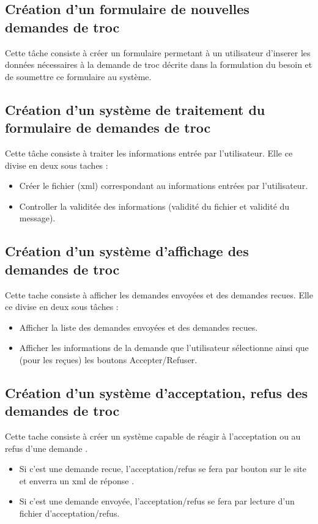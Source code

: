\documentclass{article}
\begin{document}
\subsection{Création d'un formulaire de nouvelles demandes de troc}
Cette tâche consiste à créer un formulaire permetant à un utilisateur d'inserer les données nécessaires à la demande de troc décrite dans la formulation du besoin et de soumettre ce formulaire au système.
\subsection{Création d'un système de traitement du formulaire de demandes de troc}
Cette tâche consiste à traiter les informations entrée par l'utilisateur. Elle ce divise en deux sous taches :
\begin{itemize}
  \item Créer le fichier (xml) correspondant au informations entrées par l'utilisateur.
  \item Controller la validitée des informations (validité du fichier et validité du message).
\end{itemize}

\subsection{Création d'un système d'affichage des demandes de troc}
Cette tache consiste à afficher les demandes envoyées et des demandes recues. Elle ce divise en deux sous tâches :
\begin{itemize}
  \item Afficher la liste des demandes envoyées et des demandes recues.
  \item Afficher les informations de la demande que l'utilisateur sélectionne ainsi que (pour les reçues) les boutons Accepter/Refuser.
\end{itemize}
\subsection{Création d'un système d'acceptation, refus des demandes de troc}
Cette tache consiste à créer un système capable de réagir à l'acceptation ou au refus d'une demande . 
\begin{itemize}
  \item Si c'est une demande recue, l'acceptation/refus se fera par bouton sur le site et enverra un xml de réponse .
  \item Si c'est une demande envoyée, l'acceptation/refus se fera par lecture d'un fichier d'acceptation/refus.
\end{itemize}
\end{document}
